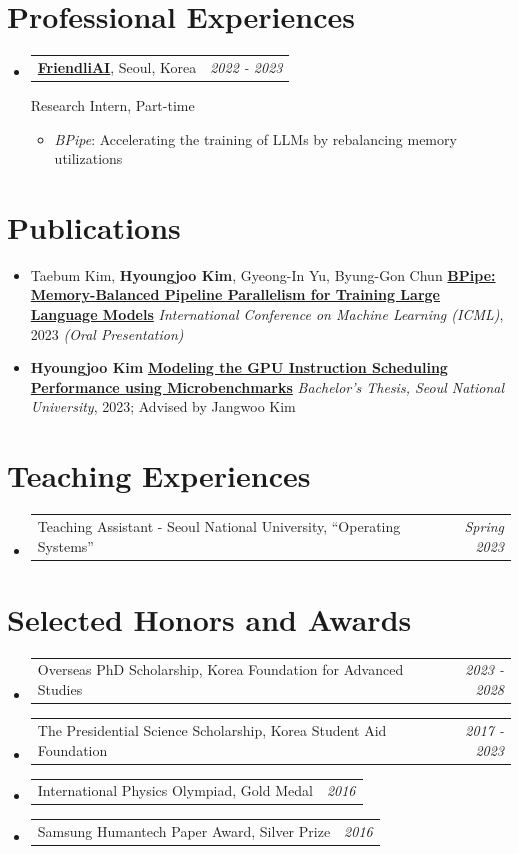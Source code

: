 \documentclass[a4paper]{article}
\makeatletter
\newcommand{\resumeSubheading}[4]{
  \vspace{-1pt}\item
    \begin{tabular*}{0.97\textwidth}{l@{\extracolsep{\fill}}r}
      \textbf{#1}, #2 & \textit{#3} \\
    \end{tabular*}
    #4
}
\newcommand{\resumeSubheadingSimple}[2]{
  \vspace{-1pt}\item
	\begin{tabular*}{0.97\textwidth}{l@{\extracolsep{\fill}}r}
	  #1 & \textit{#2} \\
	\end{tabular*}
  \vspace{-5pt}
}
\newcommand{\resumeSubheadingItem}[1]{
  \vspace{0pt}\item #1
  \vspace{0pt}
}
\newcommand{\resumeSubHeadingListStart}{\begin{itemize}[leftmargin=*]}
\newcommand{\resumeSubHeadingListEnd}{\end{itemize}}
\makeatother
\begin{document}
\section{Professional Experiences}
\resumeSubHeadingListStart
	\resumeSubheading
		{\href{https://friendli.ai}{FriendliAI}}{Seoul, Korea}
		{2022 - 2023}
		{
			Research Intern, Part-time
			\vspace{-5pt}
			\begin{itemize}
				\item {\textit{BPipe}: Accelerating the training of LLMs by rebalancing memory utilizations}
			\end{itemize}
		}
\resumeSubHeadingListEnd

\section{Publications}
\resumeSubHeadingListStart
	\resumeSubheadingItem{
		Taebum Kim, \textbf{Hyoungjoo Kim}, Gyeong-In Yu, Byung-Gon Chun \newline
		\href{https://openreview.net/forum?id=HVKmLi1iR4}{\textbf{BPipe: Memory-Balanced Pipeline Parallelism for Training Large Language Models}} \newline
		\textit{International Conference on Machine Learning (ICML)}, 2023 \textit{(Oral Presentation)}
	}
	\resumeSubheadingItem{
		\textbf{Hyoungjoo Kim} \newline
		\href{https://snu-primo.hosted.exlibrisgroup.com/permalink/f/1qb4pk8/82SNU_INST21903413170002591}{\textbf{Modeling the GPU Instruction Scheduling Performance using Microbenchmarks}} \newline
		\textit{Bachelor's Thesis, Seoul National University}, 2023; Advised by Jangwoo Kim
	}

\resumeSubHeadingListEnd

\section{Teaching Experiences}
\resumeSubHeadingListStart
	\resumeSubheadingSimple{
		Teaching Assistant - Seoul National University, ``Operating Systems''
	}{Spring 2023}
\resumeSubHeadingListEnd

\section{Selected Honors and Awards}
\resumeSubHeadingListStart
\resumeSubheadingSimple{
	Overseas PhD Scholarship, Korea Foundation for Advanced Studies
}{2023 - 2028}
\resumeSubheadingSimple{
	The Presidential Science Scholarship, Korea Student Aid Foundation
}{2017 - 2023}
\resumeSubheadingSimple{
	International Physics Olympiad, Gold Medal
}{2016}
\resumeSubheadingSimple{
	Samsung Humantech Paper Award, Silver Prize
}{2016}
\resumeSubHeadingListEnd
\end{document}
